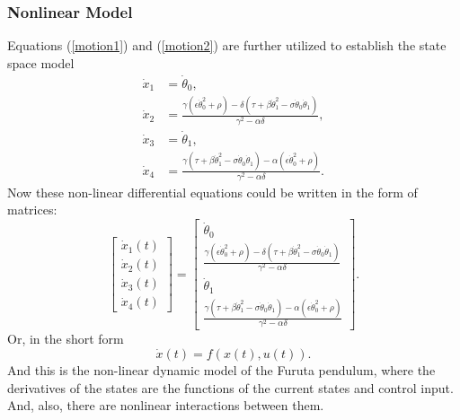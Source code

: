 \subsubsection{Nonlinear Model}
Equations (\ref{motion1}) and (\ref{motion2}) are further utilized to establish the state
space model
\begin{subequations}
	\begin{align}
	\dot{x}_1 &= \dot{\theta}_0, \\
	\dot{x}_2 &= \frac{\gamma(\epsilon\dot{\theta}_0^2+\rho)-\delta(\tau+\beta\dot{\theta}_1^2-\sigma\dot{\theta}_0\dot{\theta}_1)}{\gamma^2-\alpha\delta},\\
	\dot{x}_3 &= \dot{\theta}_1,\\
	\dot{x}_4 &= \frac{\gamma(\tau+\beta\dot{\theta}_1^2-\sigma\dot{\theta}_0\dot{\theta}_1)-\alpha(\epsilon\dot{\theta}_0^2+\rho)}{\gamma^2-\alpha\delta}.
	\end{align}
\end{subequations}
Now these non-linear differential equations could be written in the form of matrices:
\begin{equation}\label{nonlinmodel}
\begin{bmatrix}
\dot{x}_1(t) \\ \dot{x}_2(t) \\ \dot{x}_3(t) \\ \dot{x}_4(t)
\end{bmatrix} = \begin{bmatrix}
\dot{\theta}_0\\
\frac{\gamma(\epsilon\dot{\theta}_0^2+\rho)-\delta(\tau+\beta\dot{\theta}_1^2-\sigma\dot{\theta}_0\dot{\theta}_1)}{\gamma^2-\alpha\delta}\\
\dot{\theta}_1\\
\frac{\gamma(\tau+\beta\dot{\theta}_1^2-\sigma\dot{\theta}_0\dot{\theta}_1)-\alpha(\epsilon\dot{\theta}_0^2+\rho)}{\gamma^2-\alpha\delta}
\end{bmatrix}.
\end{equation}
Or, in the short form
\begin{equation} \dot{x}(t) = f(x(t),u(t)). \end{equation}
And this is the non-linear dynamic model of the Furuta pendulum, where the derivatives of the states are the functions of the current states and control input. And, also, there are nonlinear interactions between them. 

